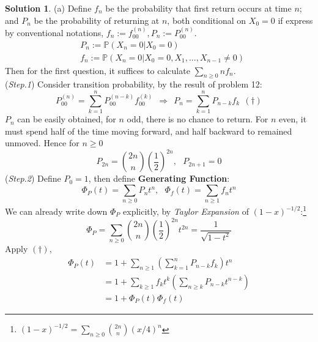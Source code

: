 \documentclass[a4paper, 10pt]{article}
\theoremstyle{definition}
\theoremstyle{hSol}
\newtheorem*{solution}{Solution}
\begin{document}
\begin{solution} (a) Define $f_{n}$ be the probability that first return occurs at time $n$; and $P_n$ be the probability of returning at $n$, both conditional on $X_0=0$ if express by conventional notations, $f_n:=f_{00}^{(n)}, P_n:=P_{00}^{(n)}$.
\begin{equation}
  \begin{split}
    & P_n := \mathbb{P}\left(X_n=0|X_0=0\right)\\
    & f_n := \mathbb{P}\left(X_n=0|X_0=0, X_1,...,X_{n-1}\ne 0\right) 
  \end{split}
\end{equation} 
Then for the first question, it suffices to calculate $\sum_{n\geq 0}nf_n$. \\
(\textit{Step.1}) Consider transition probability, by the result of problem 12:
\begin{equation}
  P_{00}^{(n)} = \sum_{k=1}^n P_{00}^{(n-k)} f_{00}^{(k)}~~\Rightarrow~~P_n = \sum_{k=1}^n P_{n-k} f_k~~(\dag)
\end{equation}
$P_n$ can be easily obtained, for $n$ odd, there is no chance to return. For $n$ even, it must spend half of the time moving forward, and half backward to remained unmoved. Hence for $n\geq 0$
\begin{equation}
  P_{2n} = \binom{2n}{n}\left(\frac{1}{2}\right)^{2n},~~~P_{2n+1}=0
\end{equation}
(\textit{Step.2}) Define $P_0=1$, then define \textbf{Generating Function}:
\begin{equation}
  \Phi_P(t) = \sum_{n\geq 0} P_n t^n,~~~\Phi_f(t) = \sum_{n\geq 1} f_n t^n
\end{equation}
We can already write down $\Phi_P$ explicitly, by \textit{Taylor Expansion} of $(1-x)^{-1/2}$:\footnote{$(1-x)^{-1/2}=\sum_{n\geq 0}\binom{2n}{n}(x/4)^n$}
\begin{equation}
  \Phi_P = \sum_{n\geq 0}\binom{2n}{n}\left(\frac{1}{2}\right)^{2n} t^{2n} = \frac{1}{\sqrt{1-t^2}}
\end{equation}
Apply $(\dag)$,
\begin{equation}
  \begin{split}
    \Phi_P(t) &= 1+\sum_{n\geq 1} \left(\sum_{k=1}^n P_{n-k} f_k\right) t^n \\
    &= 1+\sum_{k\geq 1}f_k t^k \left(\sum_{n\geq k} P_{n-k}t^{n-k} \right) \\
    &= 1+\Phi_{P}(t)\Phi_f(t)
  \end{split}
\end{equation}

\end{solution}
\end{document}
